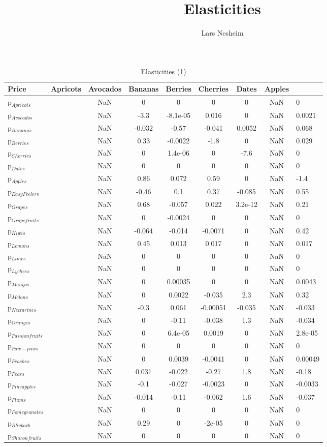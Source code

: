 \documentclass[11pt]{article}
\title{Elasticities}
\author{Lars Nesheim}
\date{}
\begin{document}
\maketitle
\begin{table}[h]
\caption{Elasticities (1)}
\label{Table: elasticities 1}
\begin{center}
\begin{tabular}{lccccccc} \hline \hline
Price &Apricots &Avocados &Bananas &Berries &Cherries &Dates &Apples \\ \hline
p$_{Apricots}$ & &NaN &0 &0 &0 &0 &NaN &0 \\
p$_{Avocados}$ & &NaN &-3.3 &-8.1e-05 &0.016 &0 &NaN &0.0021 \\
p$_{Bananas}$ & &NaN &-0.032 &-0.57 &-0.041 &0.0052 &NaN &0.068 \\
p$_{Berries}$ & &NaN &0.33 &-0.0022 &-1.8 &0 &NaN &0.029 \\
p$_{Cherries}$ & &NaN &0 &1.4e-06 &0 &-7.6 &NaN &0 \\
p$_{Dates}$ & &NaN &0 &0 &0 &0 &NaN &0 \\
p$_{Apples}$ & &NaN &0.86 &0.072 &0.59 &0 &NaN &-1.4 \\
p$_{Easy Peelers}$ & &NaN &-0.46 &0.1 &0.37 &-0.085 &NaN &0.55 \\
p$_{Grapes}$ & &NaN &0.68 &-0.057 &0.022 &3.2e-12 &NaN &0.21 \\
p$_{Grapefruits}$ & &NaN &0 &-0.0024 &0 &0 &NaN &0 \\
p$_{Kiwis}$ & &NaN &-0.064 &-0.014 &-0.0071 &0 &NaN &0.42 \\
p$_{Lemons}$ & &NaN &0.45 &0.013 &0.017 &0 &NaN &0.017 \\
p$_{Limes}$ & &NaN &0 &0 &0 &0 &NaN &0 \\
p$_{Lychees}$ & &NaN &0 &0 &0 &0 &NaN &0 \\
p$_{Mangos}$ & &NaN &0 &0.00035 &0 &0 &NaN &0.0043 \\
p$_{Melons}$ & &NaN &0 &0.0022 &-0.035 &2.3 &NaN &0.32 \\
p$_{Nectarines}$ & &NaN &-0.3 &0.061 &-0.00051 &-0.035 &NaN &-0.033 \\
p$_{Oranges}$ & &NaN &0 &-0.11 &-0.038 &1.3 &NaN &-0.034 \\
p$_{Passion fruits}$ & &NaN &0 &6.4e-05 &0.0019 &0 &NaN &2.8e-05 \\
p$_{Paw-paws}$ & &NaN &0 &0 &0 &0 &NaN &0 \\
p$_{Peaches}$ & &NaN &0 &0.0039 &-0.0041 &0 &NaN &0.00049 \\
p$_{Pears}$ & &NaN &0.031 &-0.022 &-0.27 &1.8 &NaN &-0.18 \\
p$_{Pineapples}$ & &NaN &-0.1 &-0.027 &-0.0023 &0 &NaN &-0.0033 \\
p$_{Plums}$ & &NaN &-0.014 &-0.11 &-0.062 &1.6 &NaN &-0.037 \\
p$_{Pomegranates}$ & &NaN &0 &0 &0 &0 &NaN &0 \\
p$_{Rhubarb}$ & &NaN &0.29 &0 &-2e-05 &0 &NaN &0 \\
p$_{Sharon fruits}$ & &NaN &0 &0 &0 &0 &NaN &0 \\
\end{tabular}
\end{center}
\end{table}
\end{document}

